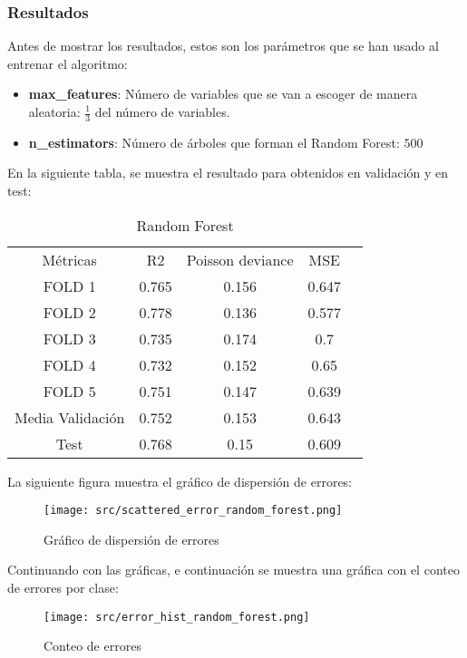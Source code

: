\subsubsection{Resultados}
Antes de mostrar los resultados, estos son los parámetros que se han usado al entrenar el algoritmo:
\begin{itemize}
	\item \textbf{max\_features}:  Número de variables que se van a escoger de manera aleatoria: $\frac{1}{3}$ del número de variables.
	\item\textbf{n\_estimators}: Número de árboles que forman el Random Forest: $500$
\end{itemize}
En la siguiente tabla, se muestra el resultado para obtenidos en validación y en test:
\linebreak
\begin{table}[H]
	\centering
	\begin{tabular}{|c|c|c|c|c}
		\cline{1-4}
		Métricas          & R2    & Poisson deviance & MSE   \\ \cline{1-4}
		FOLD 1            & 0.765 & 0.156            & 0.647 \\ \cline{1-4}
		FOLD 2            & 0.778 & 0.136            & 0.577 \\ \cline{1-4}
		FOLD 3            & 0.735 & 0.174            & 0.7   \\ \cline{1-4}
		FOLD 4            & 0.732 & 0.152            & 0.65  \\ \cline{1-4}
		FOLD 5            & 0.751 & 0.147            & 0.639 \\ \cline{1-4}
		Media  Validación & 0.752 & 0.153            & 0.643 \\ \cline{1-4}
		Test     		  & 0.768  & 0.15            & 0.609 \\ \cline{1-4}
	\end{tabular}
	\caption{Random Forest}
	\label{tab:res_random_forest}
\end{table}
La siguiente figura muestra el gráfico de dispersión de errores:\\
\linebreak
\begin{figure}[H]
	\centering
	\texttt{[image: src/scattered\_error\_random\_forest.png]}
	\caption{Gráfico de dispersión de errores}
	\label{fig:rf_scattered}
\end{figure}
Continuando con las gráficas, e continuación se muestra una gráfica con el conteo de errores por clase:
\begin{figure}[H]
	\centering
	\texttt{[image: src/error\_hist\_random\_forest.png]}
	\caption{Conteo de errores}
	\label{fig:rf_error_plot}
\end{figure}
